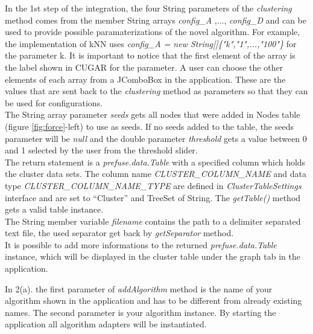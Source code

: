 \documentclass[a4paper, 11pt]{article}
\begin{document}
		In the 1st step of the integration, the four String parameters of the \emph{clustering} method comes from the member String arrays
		\emph{config\_A} ,..., \emph{config\_D} and can be used to provide possible paramaterizations of the novel algorithm. 
		For example, the implementation of kNN uses  \emph{config\_A = new String[]\{"k","1",...,"100"\}} for the parameter k. 
		It is important to notice that the first element of the array is the label shown in CUGAR for the parameter. 
		A user can choose the other elements of each array from a JComboBox in the application. 
		These are the values that are sent back to the  \emph{clustering} method as parameters so that they can be used for configurations. \\		
		The String array parameter \emph{seeds} gets all nodes that were added in Nodes table (figure \ref{fig:force}-left) to use as seeds.
		If no seeds added to the table, the seeds parameter will be  \emph{null} and the double parameter \emph{threshold} gets a value between 
		0 and 1 selected by the user from the threshold slider.\\		
		The return statement is a  \emph{prefuse.data.Table} with a specified column which
		holds the cluster data sets. The column name \emph{CLUSTER\_COLUMN\_NAME} and data type \emph{CLUSTER\_COLUMN\_NAME\_TYPE} are defined in  
		\emph{ClusterTableSettings} interface and are set to ``Cluster'' and TreeSet of String. 
		The  \emph{getTable()} method gets a valid table instance.\\
		The String member variable  \emph{filename} contains the path to a delimiter separated text file, the used separator get back by  \emph{getSeparator} method. \\
		It is possible to add more informations to the returned  \emph{prefuse.data.Table} instance, which will be displayed in the
		cluster table under the graph tab in the application.
		
		In 2(a). the first parameter of  \emph{addAlgorithm} method is the name of your algorithm shown in the application and has to be different from already existing names. 
		The second parameter is your algorithm instance. By starting the application all algorithm adapters will be instantiated.
		
\end{document}
